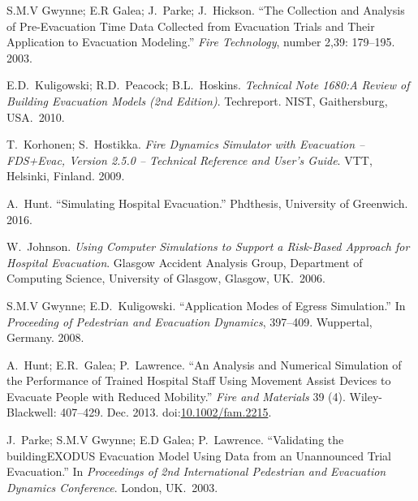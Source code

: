 \documentclass{style/llncs}
\begin{document}
{\begin{thebibliography}{36}
S.M.V Gwynne; E.R Galea; J.~Parke; J.~Hickson. \textquotedblleft{}The Collection and Analysis of Pre-Evacuation Time Data Collected from Evacuation Trials and Their Application to Evacuation Modeling.\textquotedblright{} \emph{Fire Technology}, number 2,39: 179–195. 2003.\label{34}%

E.D.~Kuligowski; R.D.~Peacock; B.L.~Hoskins. \emph{Technical Note 1680:A Review of Building Evacuation Models (2nd Edition)}. Techreport. NIST, Gaithersburg, USA.~2010.\label{2}%

T.~Korhonen; S.~Hostikka. \emph{Fire Dynamics Simulator with Evacuation – FDS+Evac, Version 2.5.0 – Technical Reference and User’s Guide}. VTT, Helsinki, Finland. 2009.\label{32}%

A.~Hunt. \textquotedblleft{}Simulating Hospital Evacuation.\textquotedblright{} Phdthesis, University of Greenwich. 2016.\label{10}%

W.~Johnson. \emph{Using Computer Simulations to Support a Risk-Based Approach for Hospital Evacuation}. Glasgow Accident Analysis Group, Department of Computing Science, University of Glasgow, Glasgow, UK.~2006.\label{11}%

S.M.V Gwynne; E.D.~Kuligowski. \textquotedblleft{}Application Modes of Egress Simulation.\textquotedblright{} In \emph{Proceeding of Pedestrian and Evacuation Dynamics}, 397–409. Wuppertal, Germany. 2008.\label{6}%

A.~Hunt; E.R.~Galea; P.~Lawrence. \textquotedblleft{}An Analysis and Numerical Simulation of the Performance of Trained Hospital Staff Using Movement Assist Devices to Evacuate People with Reduced Mobility.\textquotedblright{} \emph{Fire and Materials} 39 (4). Wiley-Blackwell: 407–429. Dec. 2013. doi:\href{https://dx.doi.org/10.1002/fam.2215}{10.1002/fam.2215}.\label{21}%

J.~Parke; S.M.V Gwynne; E.D Galea; P.~Lawrence. \textquotedblleft{}Validating the buildingEXODUS Evacuation Model Using Data from an Unannounced Trial Evacuation.\textquotedblright{} In \emph{Proceedings of 2nd International Pedestrian and Evacuation Dynamics Conference}. London, UK.~2003.\label{9}%


\end{thebibliography}}
\end{document}
